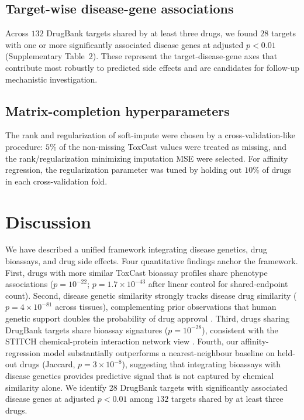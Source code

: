 \documentclass[11pt]{article}
\begin{document}
\subsection{Target-wise disease-gene associations}
Across $132$ DrugBank targets shared by at least three drugs, we found $28$ targets with one or more significantly associated disease genes at adjusted $p < 0.01$ (Supplementary Table~2). These represent the target-disease-gene axes that contribute most robustly to predicted side effects and are candidates for follow-up mechanistic investigation.

\subsection{Matrix-completion hyperparameters}
The rank and regularization of soft-impute were chosen by a cross-validation-like procedure: $5\%$ of the non-missing ToxCast values were treated as missing, and the rank/regularization minimizing imputation MSE were selected. For affinity regression, the regularization parameter was tuned by holding out $10\%$ of drugs in each cross-validation fold.

\section{Discussion}

We have described a unified framework integrating disease genetics, drug bioassays, and drug side effects. Four quantitative findings anchor the framework. First, drugs with more similar ToxCast bioassay profiles share phenotype associations ($p = 10^{-22}$; $p = 1.7 \times 10^{-43}$ after linear control for shared-endpoint count). Second, disease genetic similarity strongly tracks disease drug similarity ($p = 4 \times 10^{-81}$ across tissues), complementing prior observations that human genetic support doubles the probability of drug approval \cite{nelson2015drug,king2019drugindication,finan2017drug}. Third, drugs sharing DrugBank targets share bioassay signatures ($p = 10^{-28}$), consistent with the STITCH chemical-protein interaction network view \cite{szklarczyk2016stitch}. Fourth, our affinity-regression model \cite{pelossof2015affinity} substantially outperforms a nearest-neighbour baseline on held-out drugs (Jaccard, $p = 3 \times 10^{-8}$), suggesting that integrating bioassays with disease genetics provides predictive signal that is not captured by chemical similarity alone. We identify $28$ DrugBank targets with significantly associated disease genes at adjusted $p < 0.01$ among $132$ targets shared by at least three drugs.
\end{document}
